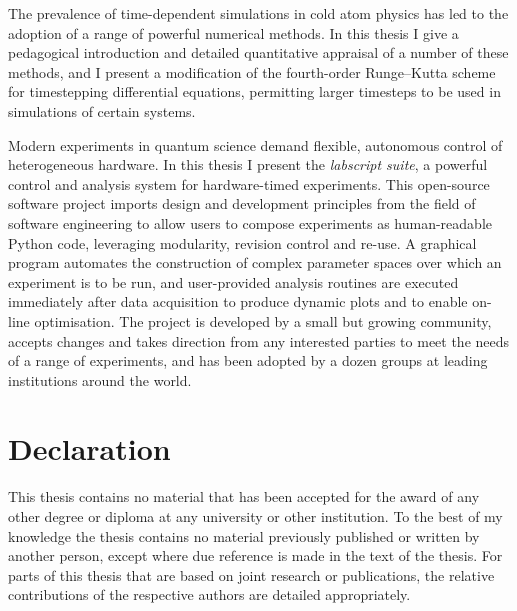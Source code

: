 The prevalence of time-dependent simulations in cold atom physics has led to the adoption of a range of powerful numerical methods. In this thesis I give a pedagogical introduction and detailed quantitative appraisal of a number of these methods, and I present a modification of the fourth-order Runge--Kutta scheme for timestepping differential equations, permitting larger timesteps to be used in simulations of certain systems.

Modern experiments in quantum science demand flexible, autonomous control of heterogeneous hardware. In this thesis I present the \emph{labscript suite}, a powerful control and analysis system for hardware-timed experiments. This open-source software project imports design and development principles from the field of software engineering to allow users to compose experiments as human-readable Python code, leveraging modularity, revision control and re-use. A graphical program automates the construction of complex parameter spaces over which an experiment is to be run, and user-provided analysis routines are executed immediately after data acquisition to produce dynamic plots and to enable on-line optimisation. The project is developed by a small but growing community, accepts changes and takes direction from any interested parties to meet the needs of a range of experiments, and has been adopted by a dozen groups at leading institutions around the world.


\chapter*{Declaration}

This thesis contains no material that has been accepted for the award of any other degree or diploma at any university or other institution. To the best of my knowledge the thesis contains no material previously published or written by another person, except where due reference is made in the text of the thesis. For parts of this thesis that are based on joint research or publications, the relative contributions of the respective authors are detailed appropriately.


